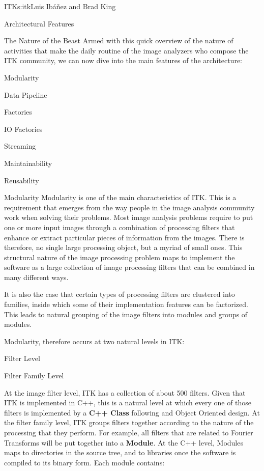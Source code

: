 \begin{aosachapter}{ITK}{s:itk}{Luis Ib\'{a}\~{n}ez and Brad King}
\begin{aosasect1}{Architectural Features}
\begin{aosasect2}{The Nature of the Beast}
Armed with this quick overview of the nature of activities that make the daily
routine of the image analyzers who compose the ITK community, we can now dive
into the main features of the architecture:

\begin{aosaitemize}
\item Modularity
\item Data Pipeline
\item Factories
\item IO Factories
\item Streaming
\item Maintainability
\item Reusability
\end{aosaitemize}

\end{aosasect2}

\begin{aosasect2}{Modularity}
Modularity is one of the main characteristics of ITK. This is a requirement
that emerges from the way people in the image analysis community work when
solving their problems. Most image analysis problems require to put one or more
input images through a combination of processing filters that enhance or
extract particular pieces of information from the images. There is therefore,
no single large processing object, but a myriad of small ones. This structural
nature of the image processing problem maps to implement the software as a
large collection of image processing filters that can be combined in many
different ways.

It is also the case that certain types of processing filters are clustered into
families, inside which some of their implementation features can be factorized.
This leads to natural grouping of the image filters into modules and groups of
modules.

Modularity, therefore occurs at two natural levels in ITK:

\begin{aosaitemize}
\item Filter Level
\item Filter Family Level
\end{aosaitemize}

At the image filter level, ITK has a collection of about 500 filters. Given
that ITK is implemented in C++, this is a natural level at which every one of
those filters is implemented by a \textbf{C++ Class} following and Object
Oriented design.  At the filter family level, ITK groups filters together
according to the nature of the processing that they perform. For example, all
filters that are related to Fourier Transforms will be put together into a
\textbf{Module}.  At the C++ level, Modules maps to directories in the source
tree, and to libraries once the software is compiled to its binary form. Each
module contains:


\end{aosasect2}
\end{aosasect1}
\end{aosachapter}
